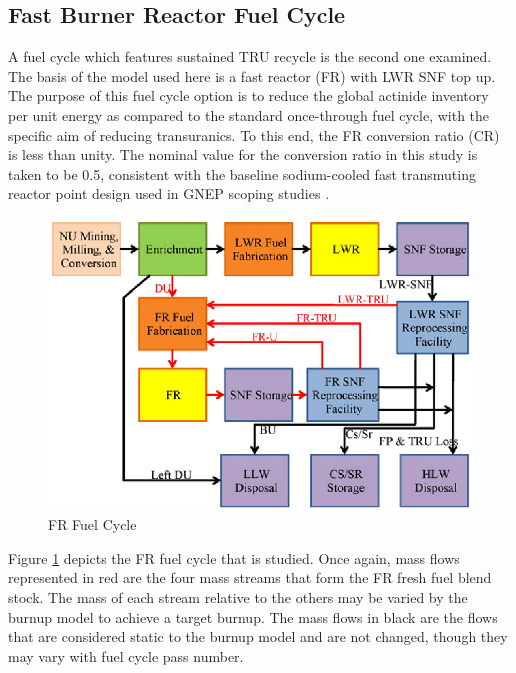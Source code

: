 \subsection{Fast Burner Reactor Fuel Cycle}
\label{1g_sec:FRFC}
A fuel cycle which features sustained TRU recycle is the second one  examined.  The basis 
of the model used here is a fast reactor (FR) with LWR SNF top up.  The purpose of this fuel cycle 
option is to reduce the global actinide inventory per unit energy as compared to the standard 
once-through fuel cycle, with the specific aim of reducing transuranics.   To this end, the FR 
conversion ratio (CR) is less than unity.  The nominal value for the conversion ratio in this 
study is taken to be 0.5, consistent with the baseline sodium-cooled fast transmuting reactor 
point design used in GNEP scoping studies \cite{AFCI2005}.  
\begin{figure}[htbp]
\caption{FR Fuel Cycle}
\label{1g_fig09}
\begin{center}
\includegraphics[scale=1.0]{one_group_method/figs/Fig09.eps}
\end{center}
\end{figure}
Figure \ref{1g_fig09} depicts the FR fuel cycle that is studied.  Once again, mass flows 
represented in red are the four mass streams that form the FR fresh fuel blend stock.  The mass 
of each stream relative to the others may be varied by the burnup model to achieve a target burnup.  
The mass flows in black are the flows that are considered static to the burnup model and are not changed, 
though they may vary with fuel cycle pass number.  


